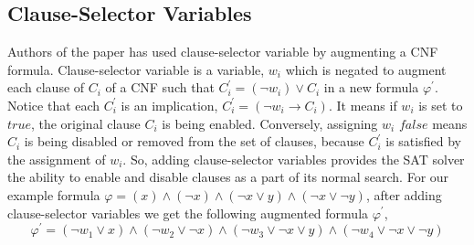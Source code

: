 \subsection{Clause-Selector Variables}
Authors of the paper \cite{karem} has used clause-selector variable by augmenting a CNF formula. Clause-selector variable is a variable, $w_{i}$ which is negated to augment each clause of $C_{i}$ of a CNF such that $C^{\prime}_{i}=(\neg w_{i})\vee C_{i}$ in a new formula $\varphi^{\prime}$. Notice that each $C^{\prime}_{i}$ is an implication, $C^{\prime}_{i}=(\neg w_{i}\rightarrow C_{i})$. It means if $w_{i}$ is set to $true$, the original clause $C_{i}$ is being enabled. Conversely, assigning $w_{i}$ $false$ means $C_{i}$ is being disabled or removed from the set of clauses, because $C^{\prime}_{i}$ is satisfied by the assignment of $w_{i}$. So, adding clause-selector variables provides the SAT solver the ability to enable and disable clauses as a part of its normal search.\newline
For our example formula $\varphi=(x)\wedge(\neg x)\wedge(\neg x\vee y)\wedge(\neg x \vee \neg y)$, after adding clause-selector variables we get the following augmented formula $\varphi^{\prime}$, 
$$\varphi^{\prime}=(\neg w_{1}\vee x)\wedge(\neg w_{2}\vee \neg x)\wedge(\neg w_{3}\vee \neg x\vee y)\wedge(\neg w_{4}\vee \neg x \vee \neg y)$$
